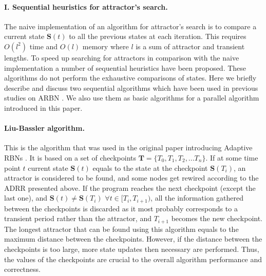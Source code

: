 \documentclass[procedia]{easychair}
\begin{document}
	\paragraph{I. Sequential heuristics for attractor's search.} The naive implementation of an algorithm for attractor's search is to compare a current state $\mathbf{S}(t)$ to all the previous states at each iteration. This requires $O(l^2)$ time and $O(l)$ memory where $l$ is a sum of attractor and transient lengths. 	
	To speed up searching for attractors in comparison with the naive implementation a number of sequential heuristics have been proposed. These algorithms do not perform the exhaustive comparisons of states. Here we briefly describe and discuss two sequential algorithms which have been used in previous studies on ARBN \cite{mlb,Gorski2016}. We also use them as basic algorithms for a parallel algorithm introduced in this paper.
	
	\paragraph{Liu-Bassler algorithm.} This is the algorithm that was used in the original paper introducing Adaptive RBNs \cite{mlb}.  It is based on a set of checkpoints $\mathbf{T} = \{T_0, T_1, T_2, ... T_n\}$. If at some time point $t$ current state $\mathbf{S}(t)$ equals to the state at the checkpoint $\mathbf{S}(T_i)$, an attractor is considered to be found, and some nodes get rewired according to the ADRR presented above. If the program reaches the next checkpoint (except the last one), and $\mathbf{S}(t) \neq \mathbf{S}(T_i)$ $ \forall t \in [T_i, T_{i+1})$, all the information gathered between the checkpoints is discarded as it most probably corresponds to a transient period rather than the attractor, and $T_{i+1}$ becomes the new checkpoint. The longest attractor that can be found using this algorithm equals to the maximum distance between the checkpoints. However, if the distance between the checkpoints is too large, more state updates then necessary are performed. Thus, the values of the checkpoints are crucial to the overall algorithm performance and correctness.
	 
\end{document}
